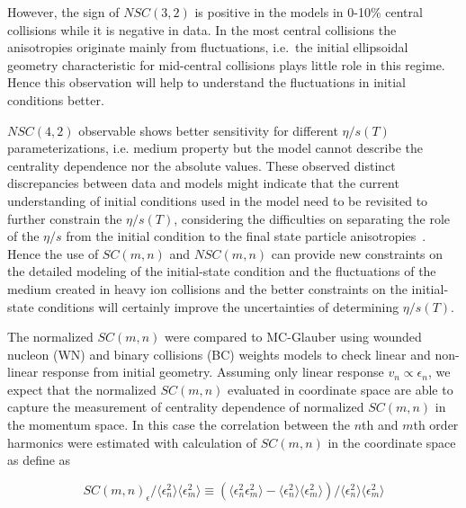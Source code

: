 However, the sign of $NSC(3,2)$ is positive in the models in 0-10\% central collisions while it is negative in data.
In the most central collisions the anisotropies originate mainly from fluctuations, i.e.\ the initial ellipsoidal geometry characteristic for mid-central collisions plays little role in this regime. Hence this observation will help to understand the fluctuations in initial conditions better.

$NSC(4,2)$ observable shows better sensitivity for different $\eta/s(T)$ parameterizations, i.e. medium property but the model cannot describe the centrality dependence nor the absolute values. These observed distinct discrepancies between data and models might indicate that the current understanding of initial conditions used in the model need to be revisited
to further constrain the $\eta/s(T)$, considering the difficulties on separating the role of the $\eta/s$  from the initial condition to the final state particle anisotropies~\cite{Romatschke:2007mq,Shen:2011zc}.
Hence the use of $SC(m,n)$ and $NSC(m,n)$ can provide new constraints on the detailed modeling of the initial-state condition and the fluctuations of the medium created in heavy ion collisions and the better constraints on the initial-state conditions will certainly improve the uncertainties of determining $\eta/s(T)$.



 The normalized $SC(m,n)$ were compared to MC-Glauber using wounded nucleon (WN) and binary collisions (BC) weights models to check linear and non-linear response from initial geometry.  Assuming only linear response $v_n \propto \epsilon_n$, we expect that the normalized $SC(m,n)$ evaluated in coordinate space are able to capture the measurement of centrality dependence of normalized $SC(m,n)$ in the momentum space. In this case the correlation between the $n$th and $m$th order harmonics were estimated with calculation of $SC(m,n)$ in the coordinate space as define as 
 
 \begin{equation}
SC(m,n)_{\epsilon}/\langle \epsilon_n^2 \rangle \langle \epsilon_m^2 \rangle  \equiv (\langle \epsilon_n^2 \epsilon_m^2 \rangle - \langle \epsilon_n^2 \rangle \langle \epsilon_m^2 \rangle) /  \langle \epsilon_n^2 \rangle \langle \epsilon_m^2 \rangle
\label{eq:sc_ecen}
\end{equation}


